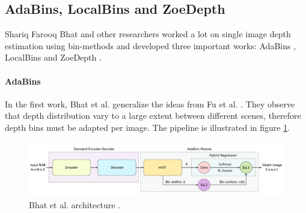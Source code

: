 \subsection{AdaBins, LocalBins and ZoeDepth}
Shariq Farooq Bhat and other researchers worked a lot on single image depth estimation using bin-methods and developed three important works: AdaBins \cite{AdaBins}, LocalBins \cite{LocalBins} and ZoeDepth \cite{ZoeDepth}.

\paragraph{AdaBins} In the first work, Bhat et al. \cite{AdaBins} generalize the ideas from Fu et al. \cite{ordinal_regression}.
They observe that depth distribution vary to a large extent between different scenes, therefore depth bins must be adapted per image.
The pipeline is illustrated in figure \ref{fig:adabins}.

\begin{figure}
	\centering
	\includegraphics[scale=0.35]{figs/adabins}
	\caption{Bhat et al. architecture \cite{AdaBins}. \label{fig:adabins}}
\end{figure}

